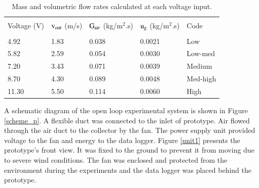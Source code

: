 \begin{table}[!ht]
	\caption{Mass and volumetric flow rates calculated at each voltage input.}
	\centering
	\begin{tabular}{p{2.1cm}p{1.8cm}p{2.4cm}p{2.2cm}p{1.8cm}}
		\hline \\[-10pt] 
		\rule[-1ex]{0pt}{2.5ex} Voltage (V) & ${\rm v_{out}}$ (m/s) & $\rm{G_{air}}$ (kg/m$^2$.s) & ${\rm u_{g}}$ (kg/m$^2$.s)  & Code \\ [3pt]
		\hline \\[-10pt]
		\rule[-1ex]{0pt}{2.5ex} 4.92 & 1.83 & 0.038 & 0.0021 & Low\\ [5pt]
		\rule[-1ex]{0pt}{2.5ex} 5.82 & 2.59 & 0.054 & 0.0030 & Low-med \\ [5pt] 
		\rule[-1ex]{0pt}{2.5ex} 7.20 & 3.43 & 0.071 & 0.0039 & Medium \\ [5pt]
		\rule[-1ex]{0pt}{2.5ex} 8.70 & 4.30 & 0.089 & 0.0048 & Med-high  \\ [5pt]
		\rule[-1ex]{0pt}{2.5ex} 11.30 & 5.50 & 0.114 & 0.0060 & High \\ [2pt]
		\hline 
	\end{tabular} 
	\label{GxV}
\end{table}





A schematic diagram of the open loop experimental system is shown in Figure \ref{scheme_p}. A flexible duct was connected to the inlet of prototype. Air flowed through the air duct to the collector by the fan. The power supply unit provided voltage to the fan and energy to the data logger. Figure \ref{unit1} presents the prototype's front view. It was fixed to the ground to prevent it from moving due to severe wind conditions. The fan was enclosed and protected from the environment during the experiments and the data logger was placed behind the prototype.


